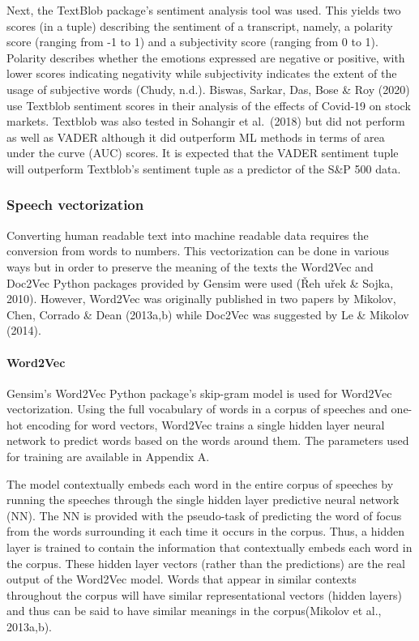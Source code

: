 \documentclass[11pt,preprint, authoryear]{elsarticle}
\numberwithin{equation}{section}
\numberwithin{figure}{section}
\numberwithin{table}{section}
\begin{document}
Next, the TextBlob package's sentiment analysis tool was used. This
yields two scores (in a tuple) describing the sentiment of a transcript,
namely, a polarity score (ranging from -1 to 1) and a subjectivity score
(ranging from 0 to 1). Polarity describes whether the emotions expressed
are negative or positive, with lower scores indicating negativity while
subjectivity indicates the extent of the usage of subjective words
(Chudy, n.d.). Biswas, Sarkar, Das, Bose \& Roy (2020) use Textblob
sentiment scores in their analysis of the effects of Covid-19 on stock
markets. Textblob was also tested in Sohangir et al.~(2018) but did not
perform as well as VADER although it did outperform ML methods in terms
of area under the curve (AUC) scores. It is expected that the VADER
sentiment tuple will outperform Textblob's sentiment tuple as a
predictor of the S\&P 500 data.

\hypertarget{speech-vectorization}{%
\subsubsection{Speech vectorization}\label{speech-vectorization}}

Converting human readable text into machine readable data requires the
conversion from words to numbers. This vectorization can be done in
various ways but in order to preserve the meaning of the texts the
Word2Vec and Doc2Vec Python packages provided by Gensim were used (Řeh
uřek \& Sojka, 2010). However, Word2Vec was originally published in two
papers by Mikolov, Chen, Corrado \& Dean (2013a,b) while Doc2Vec was
suggested by Le \& Mikolov (2014).

\hypertarget{word2vec}{%
\paragraph{Word2Vec}\label{word2vec}}

Gensim's Word2Vec Python package's skip-gram model is used for Word2Vec
vectorization. Using the full vocabulary of words in a corpus of
speeches and one-hot encoding for word vectors, Word2Vec trains a single
hidden layer neural network to predict words based on the words around
them. The parameters used for training are available in Appendix A.

The model contextually embeds each word in the entire corpus of speeches
by running the speeches through the single hidden layer predictive
neural network (NN). The NN is provided with the pseudo-task of
predicting the word of focus from the words surrounding it each time it
occurs in the corpus. Thus, a hidden layer is trained to contain the
information that contextually embeds each word in the corpus. These
hidden layer vectors (rather than the predictions) are the real output
of the Word2Vec model. Words that appear in similar contexts throughout
the corpus will have similar representational vectors (hidden layers)
and thus can be said to have similar meanings in the corpus(Mikolov et
al., 2013a,b).
\end{document}
